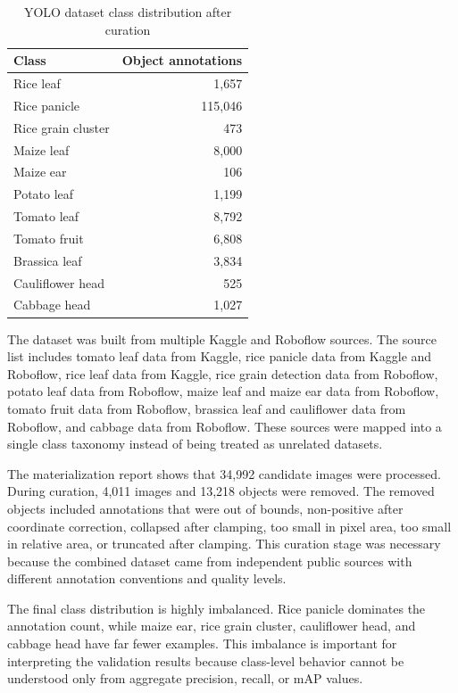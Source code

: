 \begin{table}[H]
\centering
\caption{YOLO dataset class distribution after curation}
\label{tab:yolo-dataset-class-distribution}
\begin{tabular}{@{}lr@{}}
\toprule
\textbf{Class} & \textbf{Object annotations} \\
\midrule
Rice leaf & 1,657 \\
Rice panicle & 115,046 \\
Rice grain cluster & 473 \\
Maize leaf & 8,000 \\
Maize ear & 106 \\
Potato leaf & 1,199 \\
Tomato leaf & 8,792 \\
Tomato fruit & 6,808 \\
Brassica leaf & 3,834 \\
Cauliflower head & 525 \\
Cabbage head & 1,027 \\
\bottomrule
\end{tabular}
\end{table}


The dataset was built from multiple Kaggle and Roboflow sources. The source list includes tomato
leaf data from Kaggle, rice panicle data from Kaggle and Roboflow, rice leaf data from Kaggle,
rice grain detection data from Roboflow, potato leaf data from Roboflow, maize leaf and maize
ear data from Roboflow, tomato fruit data from Roboflow, brassica leaf and cauliflower data from
Roboflow, and cabbage data from Roboflow. These sources were mapped into a single class taxonomy
instead of being treated as unrelated datasets.

The materialization report shows that 34,992 candidate images were processed. During curation,
4,011 images and 13,218 objects were removed. The removed objects included annotations that were
out of bounds, non-positive after coordinate correction, collapsed after clamping, too small in
pixel area, too small in relative area, or truncated after clamping. This curation stage was
necessary because the combined dataset came from independent public sources with different
annotation conventions and quality levels.

The final class distribution is highly imbalanced. Rice panicle dominates the annotation count,
while maize ear, rice grain cluster, cauliflower head, and cabbage head have far fewer examples.
This imbalance is important for interpreting the validation results because class-level behavior
cannot be understood only from aggregate precision, recall, or mAP values.

